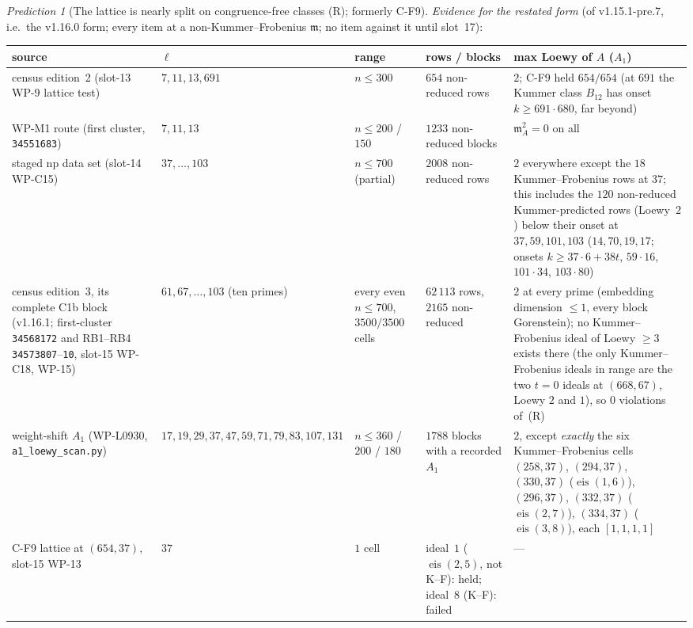 \documentclass[11pt]{article}
\theoremstyle{remark}
\newtheorem{prediction}[theorem]{Prediction}
\newcommand{\m}{\mathfrak{m}}
\begin{document}
\begin{prediction}[The lattice is nearly split on congruence-free classes (R); formerly C-F9]
\emph{Evidence for the restated form} (of v1.15.1-pre.7, i.e.\ the v1.16.0 form; every item at a non-Kummer--Frobenius $\m$; no item against it until
slot~17):
\begin{center}\small
\begin{tabular}{@{}>{\raggedright\arraybackslash}p{3.3cm}>{\raggedright\arraybackslash}p{2.2cm}>{\raggedright\arraybackslash}p{2.2cm}>{\raggedright\arraybackslash}p{2.4cm}>{\raggedright\arraybackslash}p{4.3cm}@{}}
\toprule
source & $\ell$ & range & rows / blocks & max Loewy of $A$ ($A_1$) \\
\midrule
census edition~2 (slot-13 WP-9 lattice test) & $7,11,13,691$ & $n\le300$ & $654$ non-reduced rows &
  $2$; C-F9 held $654/654$ (at $691$ the Kummer class $B_{12}$ has onset $k\ge691\cdot680$, far beyond) \\
WP-M1 route (first cluster, \texttt{34551683}) & $7,11,13$ & $n\le200$ / $150$ & $1233$ non-reduced blocks & $\m_A^2=0$ on all \\
staged np data set (slot-14 WP-C15) & $37,\dots,103$ & $n\le700$ (partial) & $2008$ non-reduced rows &
  $2$ everywhere except the $18$ Kummer--Frobenius rows at $37$; this includes the $120$ non-reduced Kummer-predicted rows
  (Loewy~$2$) below their onset at $37,59,101,103$ ($14,70,19,17$; onsets $k\ge37\cdot6+38t$, $59\cdot16$, $101\cdot34$,
  $103\cdot80$) \\
census edition~3, its complete C1b block (v1.16.1; first-cluster \texttt{34568172} and RB1--RB4 \texttt{34573807}--\texttt{10}, slot-15
  WP-C18, WP-15) & $61,67,\dots,103$ (ten primes) & every even $n\le700$, $3500/3500$ cells & $62\,113$ rows, $2165$ non-reduced &
  $2$ at every prime (embedding dimension $\le1$, every block Gorenstein); no Kummer--Frobenius ideal of Loewy $\ge3$ exists there
  (the only Kummer--Frobenius ideals in range are the two $t=0$ ideals at $(668,67)$, Loewy $2$ and $1$), so $0$ violations of~(R) \\
weight-shift $A_1$ (WP-L0930, \texttt{a1\_loewy\_scan.py}) & $17,19,29,37,47,59,71,79,83,107,131$ & $n\le360$ / $200$ / $180$ &
  $1788$ blocks with a recorded $A_1$ & $2$, except \emph{exactly} the six Kummer--Frobenius cells $(258,37)$, $(294,37)$,
  $(330,37)$ ($\operatorname{eis}(1,6)$), $(296,37)$, $(332,37)$ ($\operatorname{eis}(2,7)$), $(334,37)$ ($\operatorname{eis}(3,8)$),
  each $[1,1,1,1]$ \\
C-F9 lattice at $(654,37)$, slot-15 WP-13 & $37$ & $1$ cell & ideal~$1$ ($\operatorname{eis}(2,5)$, not K--F): held; ideal~$8$
  (K--F): failed & --- \\

\end{tabular}
\end{center}
\end{prediction}
\end{document}
